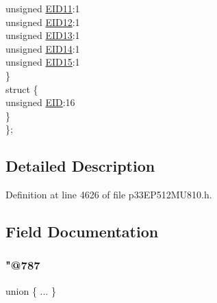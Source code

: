 \begin{DoxyCompactItemize}
\begin{tabbing}
\>\>unsigned \hyperlink{structtag_c1_r_x_f15_e_i_d_b_i_t_s_a710bdb0d602deb021b0be99066008018}{EID11}:1\\
\>\>unsigned \hyperlink{structtag_c1_r_x_f15_e_i_d_b_i_t_s_aa347bb85867bd8d4e0124f7cff8c6472}{EID12}:1\\
\>\>unsigned \hyperlink{structtag_c1_r_x_f15_e_i_d_b_i_t_s_a37d5f3edcbf6ef62f848fd4f3c584f79}{EID13}:1\\
\>\>unsigned \hyperlink{structtag_c1_r_x_f15_e_i_d_b_i_t_s_a7ffc0b0e0d99b8476b6f9a45337c17ab}{EID14}:1\\
\>\>unsigned \hyperlink{structtag_c1_r_x_f15_e_i_d_b_i_t_s_a293cd7dc1746257fa75a60cbd9383cd7}{EID15}:1\\
\>\} \\
\>struct \{\\
\>\>unsigned \hyperlink{structtag_c1_r_x_f15_e_i_d_b_i_t_s_ae80b378c9141f7c03e0b4e55b5f4b54d}{EID}:16\\
\>\} \\
\}; \\

\end{tabbing}\end{DoxyCompactItemize}


\subsection{Detailed Description}


Definition at line 4626 of file p33\+E\+P512\+M\+U810.\+h.



\subsection{Field Documentation}
\mbox{\label{structtag_c1_r_x_f15_e_i_d_b_i_t_s_a7f801d6b06383b56a99c9d12f9b15a53}} 
\subsubsection{\texorpdfstring{"@787}{@787}}
{\footnotesize\ttfamily union \{ ... \} }

\mbox{\label{structtag_c1_r_x_f15_e_i_d_b_i_t_s_ae80b378c9141f7c03e0b4e55b5f4b54d}} 
